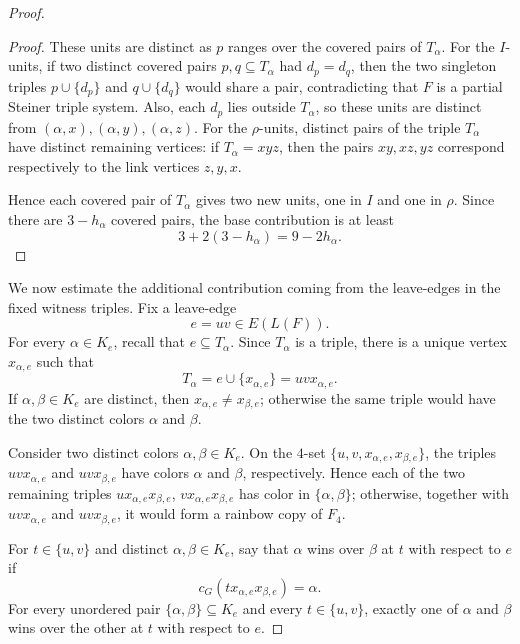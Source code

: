 \documentclass[10pt,a4paper]{amsart}
\begin{document}
\begin{proof}
\begin{proof}
        These units are distinct as $p$ ranges over the covered pairs of
        $T_\alpha$.  For the $I$-units, if two distinct covered pairs
        $p,q\subseteq T_\alpha$ had $d_p=d_q$, then the two singleton triples $p\cup\{d_p\}$ and $q\cup\{d_q\}$ would share a pair, contradicting that $F$ is a partial Steiner triple
        system.  Also, each $d_p$ lies outside $T_\alpha$, so these units are
        distinct from $(\alpha,x),(\alpha,y),(\alpha,z)$.  For the
        $\rho$-units, distinct pairs of the triple $T_\alpha$ have distinct
        remaining vertices: if $T_\alpha=xyz$, then the pairs $xy,xz,yz$
        correspond respectively to the link vertices $z,y,x$.

        Hence each covered pair of $T_\alpha$ gives two new units, one in $I$
        and one in $\rho$.  Since there are $3-h_\alpha$ covered pairs, the
        base contribution is at least
        \[
            3+2(3-h_\alpha)=9-2h_\alpha.
        \]
    \end{proof}

    We now estimate the additional contribution coming from the leave-edges in the fixed witness triples.  Fix a leave-edge
    \[
        e=uv\in E(L(F)).
    \]
    For every $\alpha\in K_e$, recall that $e\subseteq T_\alpha$.  Since
    $T_\alpha$ is a triple, there is a unique vertex $x_{\alpha,e}$ such that
    \[
        T_\alpha=e\cup\{x_{\alpha,e}\}=uvx_{\alpha,e}.
    \]
    If $\alpha,\beta\in K_e$ are distinct, then
    $x_{\alpha,e}\ne x_{\beta,e}$; otherwise the same triple would have the
    two distinct colors $\alpha$ and $\beta$.

    Consider two distinct colors $\alpha,\beta\in K_e$.  On the $4$-set $\{u,v,x_{\alpha,e},x_{\beta,e}\}$, the triples $uvx_{\alpha,e}$ and $uvx_{\beta,e}$ have colors $\alpha$ and
    $\beta$, respectively.
    Hence each of the two remaining triples $ux_{\alpha,e}x_{\beta,e}$, $vx_{\alpha,e}x_{\beta,e}$ has color in $\{\alpha,\beta\}$; otherwise, together with
    $uvx_{\alpha,e}$ and $uvx_{\beta,e}$, it would form a rainbow copy of
    $F_4$.

    For $t\in\{u,v\}$ and distinct $\alpha,\beta\in K_e$, say that
    $\alpha$ wins over $\beta$ at $t$ with respect to $e$ if
    \[
        c_G(tx_{\alpha,e}x_{\beta,e})=\alpha.
    \]
    For every unordered pair $\{\alpha,\beta\}\subseteq K_e$ and every
    $t\in\{u,v\}$, exactly one of $\alpha$ and $\beta$ wins over the other at
    $t$ with respect to $e$.


\end{proof}
\end{document}
